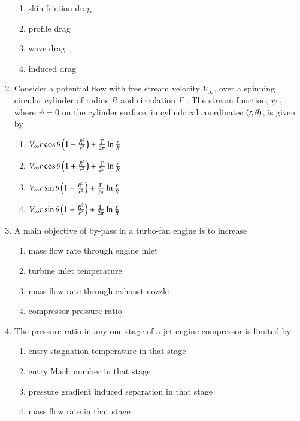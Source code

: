 \documentclass[journal]{IEEEtran}
\begin{document}
\begin{enumerate}[start=14]
\begin{multicols}{1}
\begin{enumerate}
        \item skin friction drag
        \item profile drag
        \item wave drag
        \item induced drag
    \end{enumerate}
\end{multicols}
\item Consider a potential flow with free stream velocity $ V_{\infty} $, over a spinning circular cylinder of radius  $R$  and circulation  $\Gamma$ . The stream function,  $\psi$ , where  $\psi = 0$  on the cylinder surface, in cylindrical coordinates  $\left(r, \theta\right)$, is given by
 \begin{multicols}{2}
    \begin{enumerate}
        \item  $V_{\infty} r \cos \theta \left( 1 - \frac{R^2}{r^2} \right) + \frac{\Gamma}{2 \pi} \ln \frac{r}{R} $
        \item  $V_{\infty} r \cos \theta \left( 1 + \frac{R^2}{r^2} \right) + \frac{\Gamma}{2 \pi} \ln \frac{r}{R} $
        \item  $V_{\infty} r \sin \theta \left( 1 - \frac{R^2}{r^2} \right) + \frac{\Gamma}{2 \pi} \ln \frac{r}{R} $
        \item  $V_{\infty} r \sin \theta \left( 1 + \frac{R^2}{r^2} \right) + \frac{\Gamma}{2 \pi} \ln \frac{r}{R} $
    \end{enumerate}
\end{multicols}
\item A main objective of by-pass in a turbo-fan engine is to increase
 \begin{multicols}{2}
    \begin{enumerate}
        \item mass flow rate through engine inlet
        \item turbine inlet temperature
        \item mass flow rate through exhaust nozzle
        \item compressor pressure ratio
    \end{enumerate}
\end{multicols}
\item The pressure ratio in any one stage of a jet engine compressor is limited by
    \begin{enumerate}
        \item entry stagnation temperature in that stage
        \item entry Mach number in that stage
        \item pressure gradient induced separation in that stage
        \item mass flow rate in that stage
    \end{enumerate}


\end{enumerate}
\end{document}
